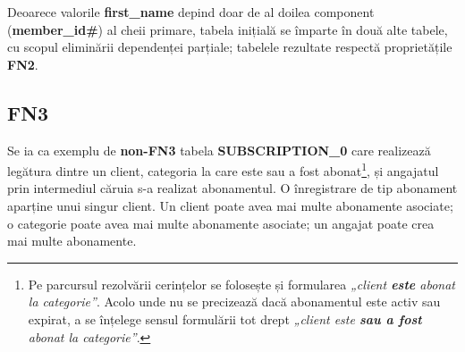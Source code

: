 \documentclass[a4paper, oneside, 12pt]{article}
\newcommand{\rowstyle}[1]{\gdef\currentrowstyle{#1}%
  #1\ignorespaces
}
\begin{document}
Deoarece valorile \textbf{first\_name} depind doar de al doilea component
(\textbf{member\_id\#}) al cheii primare, tabela inițială se împarte în două alte tabele,
cu scopul eliminării dependenței parțiale; tabelele rezultate respectă proprietățile \textbf{FN2}.

\begin{table}[H]
\centering
\caption*{Tabela \textbf{GROUP\_MEMBER\_1}:}
\end{table}

\begin{table}[H]
\centering
\caption*{Tabela \textbf{GROUP\_MEMBER\_2}:}
\end{table}

\subsection{FN3}

Se ia ca exemplu de \textbf{non-FN3} tabela \textbf{SUBSCRIPTION\_0} care
realizează legătura dintre un client, categoria la care este sau a fost
abonat\footnote{Pe parcursul rezolvării cerințelor se folosește și formularea
\emph{„client \textbf{este} abonat la categorie”}. Acolo unde nu se precizează dacă
abonamentul este activ sau expirat, a se înțelege sensul formulării tot drept \emph{„client este
\textbf{sau a fost} abonat la categorie”}.}, și angajatul prin intermediul
căruia s-a realizat abonamentul. O înregistrare de tip abonament aparține unui
singur client. Un client poate avea mai multe abonamente asociate; o categorie
poate avea mai multe abonamente asociate; un angajat poate crea mai multe
abonamente.


\begin{table}[H]
\centering
\caption*{Tabela \textbf{SUBSCRIPTION\_0}:}
\end{table}
\end{document}
